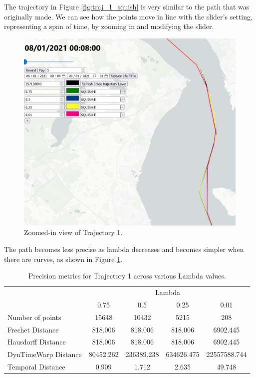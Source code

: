 The trajectory in Figure \ref{fig:traj_1_squish} is very similar to the path that was originally made. We can see how the points move in line with the slider's setting, representing a span of time, by zooming in and modifying the slider.


\begin{figure}[!ht]
    \centering
    \includegraphics[width=0.6\linewidth]{figures/Stats/squish_1_zoom.jpg}
    \caption{Zoomed-in view of Trajectory 1. }
    \label{fig:traj_1_sqzoom}
\end{figure}

The path becomes less precise as lambda decreases and becomes simpler when there are curves, as shown in Figure \ref{fig:traj_1_sqzoom}.

\begin{table}[htbp]
    \centering
    \label{tab:precision_metrics}
    \begin{tabular}{@{}lcccc@{}}
        \toprule
        & \multicolumn{4}{c}{Lambda} \\
        \cmidrule{2-5}
        & 0.75       & 0.5        & 0.25       & 0.01       \\
        \midrule
        Number of points           & 15648 & 10432 & 5215 & 208 \\
        Frechet Distance              & 818.006 & 818.006 & 818.006 & 6902.445 \\
        Hausdorff Distance             & 818.006 & 818.006 & 818.006 & 6902.445 \\
        DynTimeWarp Distance            & 80452.262 &  236389.238 & 634626.475 & 22557588.744\\
        Temporal Distance            & 0.909 & 1.712 & 2.635 & 49.748\\
        \bottomrule
    \end{tabular}
    \caption{Precision metrics for Trajectory 1 across various Lambda values. }
\end{table}

